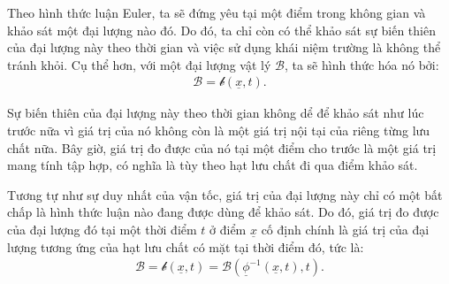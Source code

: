 \documentclass[../../../main.tex]{subfiles}
\begin{document}
	Theo hình thức luận Euler, ta sẽ đứng yêu tại một điểm trong không gian và khảo sát một đại lượng nào đó. Do đó, ta chỉ còn có thể khảo sát sự biến thiên của đại lượng này theo thời gian và việc sử dụng khái niệm trường là không thể tránh khỏi. Cụ thể hơn, với một đại lượng vật lý $\mathscr{B}$, ta sẽ hình thức hóa nó bởi:
		\begin{align}
			\mathscr{B}=\mathscr{b}\left(\underline{x},t\right).
		\end{align}

	Sự biến thiên của đại lượng này theo thời gian không dể để khảo sát như lúc trước nữa vì giá trị của nó không còn là một giá trị nội tại của riêng từng lưu chất nữa. Bây giờ, giá trị đo được của nó tại một điểm cho trước là một giá trị mang tính tập hợp, có nghĩa là tùy theo hạt lưu chất đi qua điểm khảo sát.

	Tương tự như sự duy nhất của vận tốc, giá trị của đại lượng này chỉ có một bất chấp là hình thức luận nào đang được dùng để khảo sát. Do đó, giá trị đo được của đại lượng đó tại một thời điểm $t$ ở điểm $\underline{x}$ cố định chính là giá trị của đại lượng tương ứng của hạt lưu chất có mặt tại thời điểm đó, tức là:
		\begin{align}
			\mathscr{B}=\mathscr{b}\left(\underline{x},t\right)=\mathscr{B}\left(\underline{\phi}^{-1}\left(\underline{x},t\right),t\right).
		\end{align}
\end{document}
